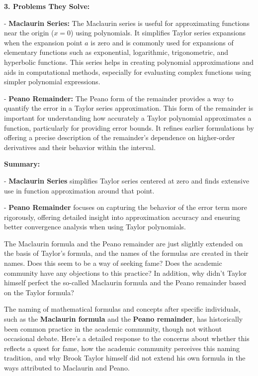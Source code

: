 \documentclass[a4paper,12pt]{book}
\begin{document}
\textbf{3. Problems They Solve:}

- \textbf{Maclaurin Series:}  The Maclaurin series is useful for approximating functions near the origin (\( x = 0 \)) using polynomials. It simplifies Taylor series expansions when the expansion point \( a \) is zero and is commonly used for expansions of elementary functions such as exponential, logarithmic, trigonometric, and hyperbolic functions. This series helps in creating polynomial approximations and aids in computational methods, especially for evaluating complex functions using simpler polynomial expressions.

- \textbf{Peano Remainder:}  The Peano form of the remainder provides a way to quantify the error in a Taylor series approximation. This form of the remainder is important for understanding how accurately a Taylor polynomial approximates a function, particularly for providing error bounds. It refines earlier formulations by offering a precise description of the remainder’s dependence on higher-order derivatives and their behavior within the interval.

\textbf{Summary:}

- \textbf{Maclaurin Series} simplifies Taylor series centered at zero and finds extensive use in function approximation around that point.

- \textbf{Peano Remainder} focuses on capturing the behavior of the error term more rigorously, offering detailed insight into approximation accuracy and ensuring better convergence analysis when using Taylor polynomials.

\begin{bluebox}
The Maclaurin formula and the Peano remainder are just slightly extended on the basis of Taylor's formula, and the names of the formulas are created in their names. Does this seem to be a way of seeking fame? Does the academic community have any objections to this practice? In addition, why didn't Taylor himself perfect the so-called Maclaurin formula and the Peano remainder based on the Taylor formula?
\end{bluebox}

The naming of mathematical formulas and concepts after specific individuals, such as the \textbf{Maclaurin formula} and the \textbf{Peano remainder}, has historically been common practice in the academic community, though not without occasional debate. Here’s a detailed response to the concerns about whether this reflects a quest for fame, how the academic community perceives this naming tradition, and why Brook Taylor himself did not extend his own formula in the ways attributed to Maclaurin and Peano.
\end{document}

